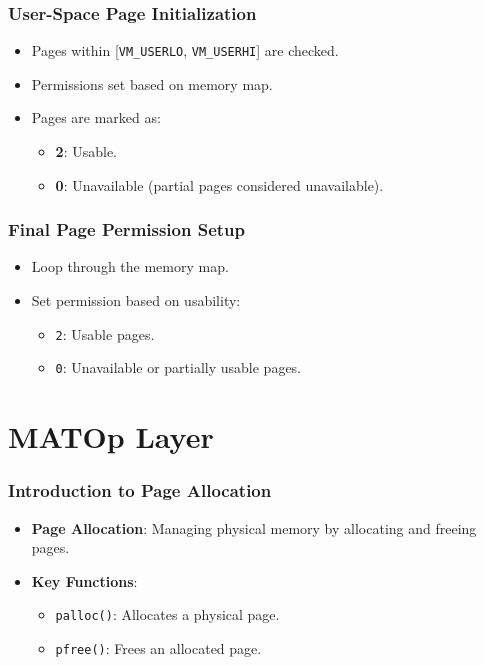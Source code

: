 \documentclass{beamer}
\begin{document}
	\begin{frame}
		\frametitle{User-Space Page Initialization}
		\begin{itemize}
			\item Pages within [\texttt{VM\_USERLO}, \texttt{VM\_USERHI}] are checked.
			\item Permissions set based on memory map.
			\item Pages are marked as:
			\begin{itemize}
				\item \textbf{2}: Usable.
				\item \textbf{0}: Unavailable (partial pages considered unavailable).
			\end{itemize}
		\end{itemize}
	\end{frame}
	
	
	\begin{frame}
		\frametitle{Final Page Permission Setup}
		\begin{itemize}
			\item Loop through the memory map.
			\item Set permission based on usability:
			\begin{itemize}
				\item \texttt{2}: Usable pages.
				\item \texttt{0}: Unavailable or partially usable pages.
			\end{itemize}
		\end{itemize}
		
		
	\end{frame}
	
	
	
	\section{MATOp Layer}
	\begin{frame}
		\frametitle{Introduction to Page Allocation}
		\begin{itemize}
			\item \textbf{Page Allocation}: Managing physical memory by allocating and freeing pages.
			\item \textbf{Key Functions}:
			\begin{itemize}
				\item \texttt{palloc()}: Allocates a physical page.
				\item \texttt{pfree()}: Frees an allocated page.
			\end{itemize}
		\end{itemize}
	\end{frame}
	
\end{document}
